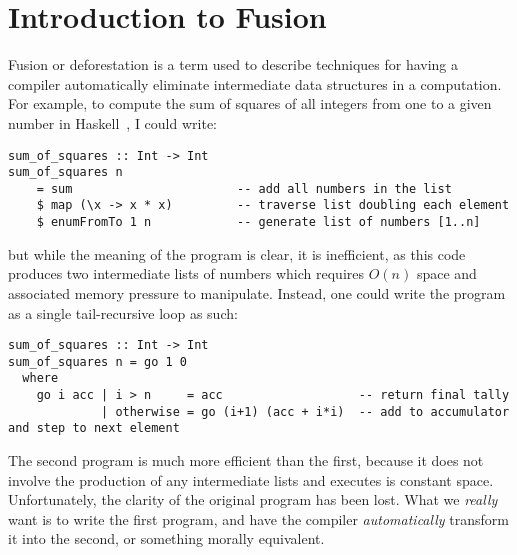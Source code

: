 % 

\section{Introduction to Fusion}

Fusion or deforestation is a term used to describe techniques for having a
compiler automatically eliminate intermediate data structures in a computation.
For example, to compute the sum of squares of all integers from one to a given
number in Haskell~\cite{Haskell:1998}, I could write:
%
\begin{lstlisting}[style=haskell]
sum_of_squares :: Int -> Int
sum_of_squares n
    = sum                       -- add all numbers in the list
    $ map (\x -> x * x)         -- traverse list doubling each element
    $ enumFromTo 1 n            -- generate list of numbers [1..n]
\end{lstlisting}
%
but while the meaning of the program is clear, it is inefficient, as this code
produces two intermediate lists of numbers which requires $O(n)$ space and
associated memory pressure to manipulate. Instead, one could write the program
as a single tail-recursive loop as such:
%
\begin{lstlisting}[style=haskell]
sum_of_squares :: Int -> Int
sum_of_squares n = go 1 0
  where
    go i acc | i > n     = acc                   -- return final tally
             | otherwise = go (i+1) (acc + i*i)  -- add to accumulator and step to next element
\end{lstlisting}
%
The second program is much more efficient than the first, because it does not
involve the production of any intermediate lists and executes is constant space.
Unfortunately, the clarity of the original program has been lost. What we
\emph{really} want is to write the first program, and have the compiler
\emph{automatically} transform it into the second, or something morally
equivalent.

